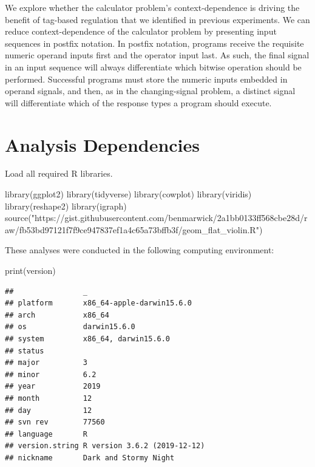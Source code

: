 \documentclass[
]{book}
\newenvironment{Shaded}{\begin{snugshade}}{\end{snugshade}}
\newcommand{\FunctionTok}[1]{\textcolor[rgb]{0.00,0.00,0.00}{#1}}
\newcommand{\NormalTok}[1]{#1}
\newcommand{\StringTok}[1]{\textcolor[rgb]{0.31,0.60,0.02}{#1}}
\begin{document}
We explore whether the calculator problem's context-dependence is driving the benefit of tag-based regulation that we identified in previous experiments.
We can reduce context-dependence of the calculator problem by presenting input sequences in postfix notation.
In postfix notation, programs receive the requisite numeric operand inputs first and the operator input last.
As such, the final signal in an input sequence will always differentiate which bitwise operation should be performed.
Successful programs must store the numeric inputs embedded in operand signals, and then, as in the changing-signal problem, a distinct signal will differentiate which of the response types a program should execute.

\hypertarget{analysis-dependencies-5}{%
\section{Analysis Dependencies}\label{analysis-dependencies-5}}

Load all required R libraries.

\begin{Shaded}
\begin{Highlighting}[]
\FunctionTok{library}\NormalTok{(ggplot2)}
\FunctionTok{library}\NormalTok{(tidyverse)}
\FunctionTok{library}\NormalTok{(cowplot)}
\FunctionTok{library}\NormalTok{(viridis)}
\FunctionTok{library}\NormalTok{(reshape2)}
\FunctionTok{library}\NormalTok{(igraph)}
\FunctionTok{source}\NormalTok{(}\StringTok{"https://gist.githubusercontent.com/benmarwick/2a1bb0133ff568cbe28d/raw/fb53bd97121f7f9ce947837ef1a4c65a73bffb3f/geom\_flat\_violin.R"}\NormalTok{)}
\end{Highlighting}
\end{Shaded}

These analyses were conducted in the following computing environment:

\begin{Shaded}
\begin{Highlighting}[]
\FunctionTok{print}\NormalTok{(version)}
\end{Highlighting}
\end{Shaded}

\begin{verbatim}
##                _                           
## platform       x86_64-apple-darwin15.6.0   
## arch           x86_64                      
## os             darwin15.6.0                
## system         x86_64, darwin15.6.0        
## status                                     
## major          3                           
## minor          6.2                         
## year           2019                        
## month          12                          
## day            12                          
## svn rev        77560                       
## language       R                           
## version.string R version 3.6.2 (2019-12-12)
## nickname       Dark and Stormy Night
\end{verbatim}
\end{document}
